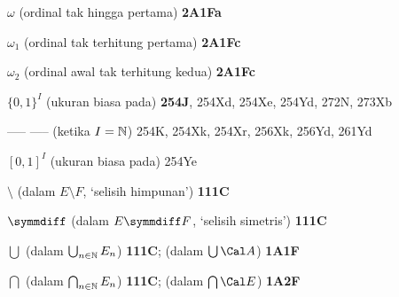 \indexmedskip
\indexheader{$\scriptstyle\pmb{\omega}$}

$\omega$ (ordinal tak hingga pertama) {\bf 2A1Fa}






$\omega_1$ (ordinal tak terhitung pertama) {\bf 2A1Fc}















$\omega_2$ (ordinal awal tak terhitung kedua)
{\bf 2A1Fc}














\indexmedskip

$\{0,1\}^I$ (ukuran biasa pada) {\bf 254J}, 254Xd, 254Xe, 254Yd,
272N, 273Xb 




----- ----- (ketika $I=\Bbb N$) 254K, 254Xk, 254Xr, 256Xk, 256Yd,
261Yd 














$[0,1]^I$ (ukuran biasa pada) 254Ye


















\indexmedskip
{}

$\setminus$ (dalam $E\setminus F$, `selisih himpunan') {\bf 111C}

$\symmdiff$ (dalam $E\symmdiff F$, `selisih simetris') {\bf 111C}







$\bigcup$ (dalam $\bigcup_{n\in\Bbb N}E_n$) {\bf 111C};
  (dalam $\bigcup\Cal A$) {\bf 1A1F}

$\bigcap$ (dalam $\bigcap_{n\in\Bbb N}E_n$) {\bf 111C};
  (dalam $\bigcap\Cal E$) {\bf 1A2F}

